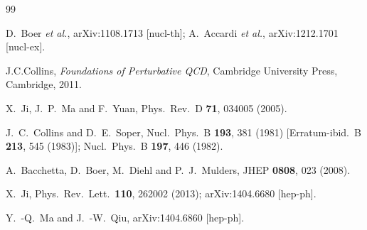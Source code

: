\documentclass[aps,prd,preprint,tightenlines,superscriptaddress,nofootinbib]{revtex4}
\begin{document}
\begin{thebibliography}{99}

  D.~Boer %
  {\it et al.},
  arXiv:1108.1713 [nucl-th];
  A.~Accardi%
  {\it et al.},
  arXiv:1212.1701 [nucl-ex].
  
  
J.C.Collins, {\it Foundations of Perturbative QCD}, Cambridge University Press, Cambridge, 2011.

  X.~Ji, J.~P.~Ma and F.~Yuan,
  Phys.\ Rev.\ D {\bf 71}, 034005 (2005).

J.~C.~Collins and D.~E.~Soper,
Nucl.\ Phys.\ B {\bf 193}, 381 (1981) [Erratum-ibid.\ B {\bf 213},
545 (1983)];
Nucl.\ Phys.\ B {\bf 197}, 446 (1982).

 A.~Bacchetta, D.~Boer, M.~Diehl and P.~J.~Mulders,
  JHEP {\bf 0808}, 023 (2008).

  X.~Ji,
Phys.\ Rev.\ Lett.\  {\bf 110}, 262002 (2013);
  arXiv:1404.6680 [hep-ph].


  Y.~-Q.~Ma and J.~-W.~Qiu,
  arXiv:1404.6860 [hep-ph].




\end{thebibliography}
\end{document}
